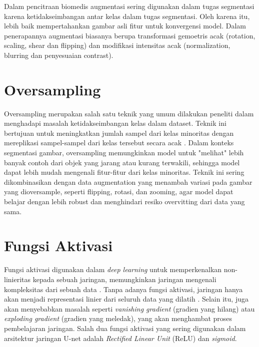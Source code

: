 \noindent Dalam pencitraan biomedis augmentasi sering digunakan dalam tugas segmentasi karena ketidakseimbangan antar kelas dalam tugas segmentasi. Oleh karena itu, lebih baik mempertahankan gambar asli fitur untuk konvergensi model. Dalam penerapannya augmentasi biasanya berupa transformasi gemoetris acak (rotation, scaling, shear dan flipping) dan modifikasi intensitas acak (normalization, blurring dan penyesuaian contrast)\cite{minaee_image_2020}.

\section{Oversampling}

\noindent Oversampling merupakan salah satu teknik yang umum dilakukan peneliti dalam menghadapi masalah ketidakseimbangan kelas dalam dataset. Teknik ini bertujuan untuk meningkatkan jumlah sampel dari kelas minoritas dengan mereplikasi sampel-sampel dari kelas tersebut secara acak \cite{bria_addressing_2020}. Dalam konteks segmentasi gambar, oversampling memungkinkan model untuk "melihat" lebih banyak contoh dari objek yang jarang atau kurang terwakili, sehingga model dapat lebih mudah mengenali fitur-fitur dari kelas minoritas. Teknik ini sering dikombinasikan dengan data augmentation yang menambah variasi pada gambar yang dioversample, seperti flipping, rotasi, dan zooming, agar model dapat belajar dengan lebih robust dan menghindari resiko overvitting dari data yang sama.


\section{Fungsi Aktivasi}

\noindent Fungsi aktivasi digunakan dalam \textit{deep learning} untuk memperkenalkan non-linieritas kepada sebuah jaringan, memungkinkan jaringan mengenali kompleksitas dari sebuah data \cite{younisse_fine-tuning_2023,heaton_ian_2018}. Tanpa adanya fungsi aktivasi, jaringan hanya akan menjadi representasi linier dari seluruh data yang dilatih \cite{chiang_activation_2023}. Selain itu, juga akan menyebabkan masalah seperti \textit{vanishing gradient} (gradien yang hilang) atau \textit{exploding gradient} (gradien yang meledak), yang akan menghambat proses pembelajaran jaringan. Salah dua fungsi aktivasi yang sering digunakan dalam arsitektur jaringan U-net adalah \textit{Rectified Linear Unit} (ReLU) dan \textit{sigmoid}. %

